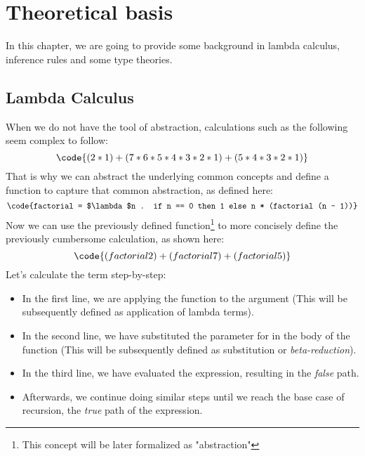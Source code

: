 \chapter{Theoretical basis}

In this chapter, we are going to provide some background in lambda calculus, inference rules and some type theories.

\section{Lambda Calculus}

When we do not have the tool of abstraction, calculations such as the following seem complex to follow:
\begin{equation*}
       \code{(2*1) + (7*6*5*4*3*2*1) + (5*4*3*2*1)}
\end{equation*}
That is why we can abstract the underlying common concepts and define a function to capture that common abstraction, as defined here:
\begin{equation*}
       \code{factorial = $\lambda$n . if n == 0 then 1 else n * (factorial (n - 1))}
\end{equation*}
Now we can use the previously defined function\footnote{This concept will be later formalized as "abstraction"} to more concisely define the previously cumbersome calculation, as shown here:
\begin{equation*}
       \code{(factorial 2) + (factorial 7) + (factorial 5)}
\end{equation*}
Let's calculate the term  step-by-step:

\begin{itemize}
       \item In the first line, we are applying the function  to the argument  (This will be subsequently defined as application of lambda terms).
       \item In the second line, we have substituted the parameter  for  in the body of the function (This will be subsequently defined as substitution or \emph{beta-reduction}).
       \item In the third line, we have evaluated the  expression, resulting in the \emph{false} path.
       \item Afterwards, we continue doing similar steps until we reach the base case of recursion, the \emph{true} path of the  expression.
\end{itemize}

